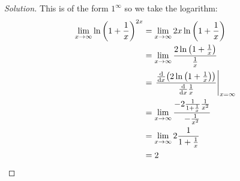 \documentclass{agony}
\begin{document}
\begin{enumerate}[(a)]
        \begin{proof}[Solution]
          This is of the form $1^\infty$ so we take the logarithm:
          \begin{align*}
            \lim_{x\to\infty} \ln \left(1 + \frac{1}{x}\right)^{2x}
             & = \lim_{x\to\infty} 2x\ln \left(1 + \frac{1}{x}\right)                            \\
             & = \lim_{x\to\infty} \frac{2\ln \left(1 + \frac{1}{x}\right)}{\frac1x}             \\
             & = \left.\frac{\dv{x}(2\ln \left(1 + \frac{1}{x}\right))}{\dv{x}\frac1x}\right|_{x=\infty}  \\
             & = \lim_{x\to\infty} \frac{-2\frac{1}{1+\frac{1}{x}}\frac{1}{x^2}}{-\frac{1}{x^2}} \\
             & = \lim_{x\to\infty} 2\frac{1}{1+\frac{1}{x}}                                      \\
             & = 2 \qedhere
          \end{align*}
        \end{proof}
\end{enumerate}
\end{document}

